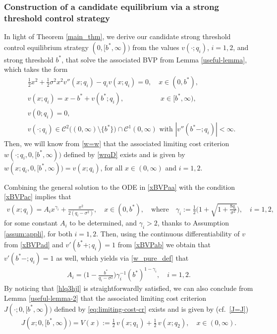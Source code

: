 \documentclass[11pt]{article} %
\numberwithin{komcounter}{section}
\begin{document}
\subsubsection{Construction of a candidate equilibrium via a strong threshold control strategy}
\label{sec:inform-strong}

In light of Theorem \ref{main_thm}, we derive our candidate strong threshold control equilibrium strategy $(0,[b^*,\infty))$ from the values $v(\cdot;q_i)$, $i=1,2$, and strong threshold $b^*$, that solve the associated BVP from Lemma \ref{useful-lemma}, which takes the form 
\begin{align}
&\tfrac12 x^2 + \tfrac12 \sigma^2 x^2 v''(x;q_i) - q_i v(x;q_i) = 0, \quad x \in (0,b^*), 
\label{xBVPaa}\\
&v(x;q_i) = x - b^* + v(b^*;q_i), \qquad \qquad \quad \; x \in [b^*,\infty), 
\label{xBVPab}\\
&v(0;q_i) = 0, 
\label{xBVPac}\\
& \text{$v(\cdot;q_i)\in \mathcal{C}^2\big( (0,\infty) \setminus \{b^*\} \big) \cap \mathcal{C}^1(0,\infty)$ with $|v''(b^*-;q_i)|<\infty$.}
\label{xBVPad}
\end{align}
Then, we will know from \eqref{w=w} that the associated limiting cost criterion $w(\cdot;q_i,0,[b^*,\infty))$ defined by \eqref{wrqD} exists and is given by $w(x;q_i,0,[b^*,\infty)) = v(x;q_i)$, for all $x \in (0,\infty)$ and $i=1,2$.

Combining the general solution to the ODE in \eqref{xBVPaa} with the condition \eqref{xBVPac} implies that 
\begin{align}\label{w_pure_def}
v(x;q_i)=A_ix^{\gamma_i}+\frac{x^2}{2(q_i-\sigma^2)}, \quad x\in (0,b^*), 
\quad \text{where} \quad 
\gamma_i:=\frac{1}{2}\bigg(1+\sqrt{1+\frac{8q_i}{\sigma^2}} \bigg),\quad i=1,2,
\end{align}
for some constant $A_i$ to be determined, and $\gamma_i>2$, thanks to Assumption \ref{assum:appli}, for both $i=1,2$. 
Then, using the continuous differentiability of $v$ from \eqref{xBVPad} and $v'(b^*+;q_i) = 1$ from \eqref{xBVPab} we obtain that $v'(b^*-;q_i) = 1$ as well, which yields via \eqref{w_pure_def} that 
\begin{align} \label{Ai}
A_i = \Big(1-\frac{b^*}{q_i-\sigma^2} \Big) \gamma_i^{-1} (b^*)^{1-\gamma_i} , 
\quad i=1,2.
\end{align}
By noticing that \eqref{hlq3hjl} is straightforwardly satisfied, we can also conclude from Lemma \ref{useful-lemma-2} that the associated limiting cost criterion $J(\cdot;0,[b^*,\infty))$ defined by \eqref{eq:limiting-cost-cr} exists and is given by (cf.~\eqref{J=J})
\begin{equation} \label{J_pure_def}
J(x;0,[b^*,\infty)) = V(x) := \tfrac12 \, v(x; q_1) + \tfrac12 \, v(x; q_2), \quad x \in (0,\infty).
\end{equation}
\end{document}

